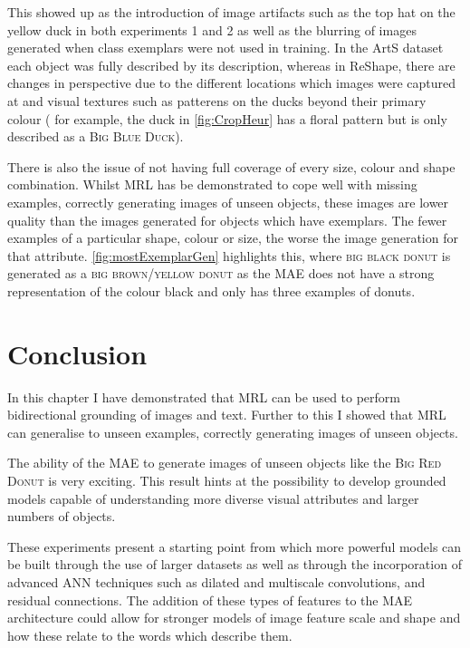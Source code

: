 This showed up as the introduction of image artifacts such as the top hat on the yellow duck in both experiments 1 and 2 as well as the blurring of images generated when class exemplars were not used in training. In the ArtS dataset each object was fully described by its description, whereas in ReShape, there are changes in perspective due to the different locations which images were captured at and visual textures such as patterens on the ducks beyond their primary colour ( for example, the duck in \autoref{fig:CropHeur} has a floral pattern but is only described as a \textsc{Big Blue Duck}).

There is also the issue of not having full coverage of every size, colour and shape combination. Whilst MRL has be demonstrated to cope well with missing examples, correctly generating images of unseen objects, these images are lower quality than the images generated for objects which have exemplars. The fewer examples of a particular shape, colour or size, the worse the image generation for that attribute. \autoref{fig:mostExemplarGen} highlights this, where \textsc{big black donut} is generated as a \textsc{big brown/yellow donut} as the MAE does not have a strong representation of the colour black and only has three examples of donuts.



\section{Conclusion}
In this chapter I have demonstrated that \ac{MRL} can be used to perform bidirectional grounding of images and text. Further to this I showed that MRL can generalise to unseen examples, correctly generating images of unseen objects.

The ability of the \ac{MAE} to generate images of unseen objects like the \textsc{Big Red Donut} is very exciting. This result hints at the possibility to develop grounded models capable of understanding more diverse visual attributes and larger numbers of objects.

These experiments present a starting point from which more powerful models can be built through the use of larger datasets as well as through the incorporation of advanced  \ac{ANN} techniques such as dilated and multiscale convolutions, and residual connections. The addition of these types of features to the \ac{MAE} architecture could allow for stronger models of image feature scale and shape and how these relate to the words which describe them.
\theendnotes